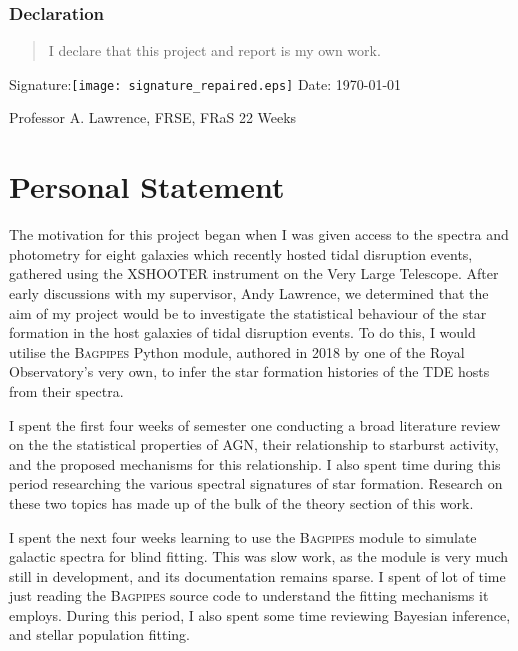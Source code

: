 \documentclass[a4paper,12pt]{article}
\begin{document}
\vspace*{1cm}

\subsubsection*{Declaration}
\begin{quotation}
  I declare that this project and report is my own work.
\end{quotation}

\hspace*{1cm}
\noindent Signature:\hspace*{1cm}\texttt{[image: signature\_repaired.eps]}
\hfill
Date: \today

\vfill
{} Professor A. Lawrence, FRSE, FRaS
\hfill
22 Weeks

\newpage
\thispagestyle{empty}
\section*{Personal Statement}\label{sec:personal_statement}

The motivation for this project began when I was given access to the spectra and photometry for eight galaxies which recently hosted tidal disruption
events, gathered using the XSHOOTER instrument on the Very Large Telescope.
After early discussions with my supervisor, Andy Lawrence, we determined that
the aim of my project would be to investigate the statistical behaviour of the
star formation in the host galaxies of tidal disruption events. To do this, I
would utilise the \textsc{Bagpipes} Python module, authored in 2018 by one of
the Royal Observatory's very own, to infer the star formation histories of the
TDE hosts from their spectra.

I spent the first four weeks of semester one conducting a broad literature
review on the the statistical properties of AGN, their relationship to
starburst activity, and the proposed mechanisms for this relationship. I also
spent time during this period researching the various spectral signatures of
star formation. Research on these two topics has made up of the bulk of the
theory section of this work.

I spent the next four weeks learning to use the \textsc{Bagpipes} module to
simulate galactic spectra for blind fitting. This was slow work, as the module
is very much still in development, and its documentation remains sparse. I
spent of lot of time just reading the \textsc{Bagpipes} source code to
understand the fitting mechanisms it employs. During this period, I also spent
some time reviewing Bayesian inference, and stellar population fitting.
\end{document}
